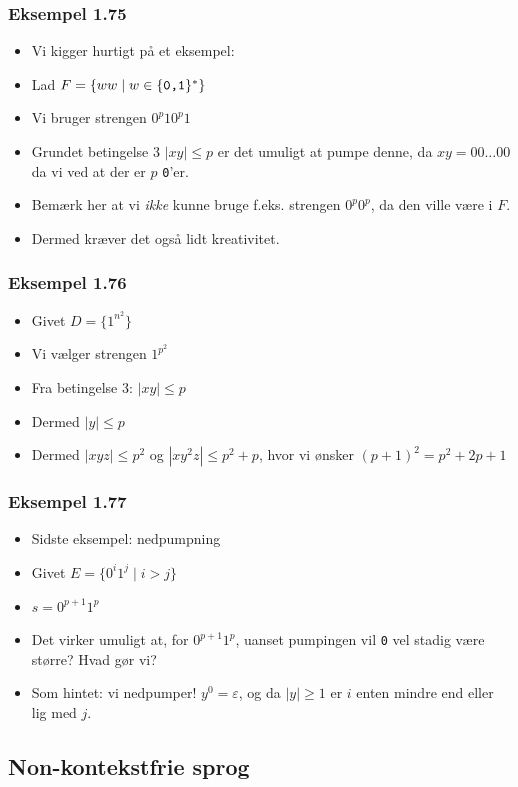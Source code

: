 \begin{frame}
	\frametitle{Eksempel 1.75}

	\begin{itemize}
		\item Vi kigger hurtigt på et eksempel:
		\item Lad $F = \{ww \mid w \in \{\text{\texttt{0,1}}\}^{*}\}$
		\item Vi bruger strengen $0^{p}10^{p}1$
		\item Grundet betingelse 3 $|xy| \le p$ er det umuligt at pumpe denne, da $xy = 00 \ldots 00$ da vi ved at der er $p$ \texttt{0}'er.
		\item Bemærk her at vi \textit{ikke} kunne bruge f.eks. strengen $0^{p}0^{p}$, da den ville være i $F$.
		\item Dermed kræver det også lidt kreativitet.
	\end{itemize}
\end{frame}

\begin{frame}
	\frametitle{Eksempel 1.76}
	\begin{itemize}
		\item Givet $D = \{1^{n^{2}}\}$
		\item Vi vælger strengen $1^{p^{2}}$
		\item Fra betingelse 3: $|xy| \le p$
		\item Dermed $|y| \le p$
		\item Dermed $|xyz| \le p^{2}$ og $|xy^{2}z| \le p^{2}+p$, hvor vi ønsker $(p+1)^{2} = p^{2} + 2p + 1$
	\end{itemize}
\end{frame}


\begin{frame}
	\frametitle{Eksempel 1.77}
	\begin{itemize}
		\item<1-> Sidste eksempel: nedpumpning
		\item<1-> Givet $E = \{0^{i}1^{j} \mid i > j\}$
		\item<1-> $s = 0^{p+1}1^{p}$
		\item<1-> Det virker umuligt at, for $0^{p+1}1^{p}$, uanset pumpingen vil \texttt{0} vel stadig være større? Hvad gør vi?
		\item<2> Som hintet: vi nedpumper! $y^{0} = \varepsilon$, og da $|y| \ge 1$ er $i$ enten mindre end eller lig med $j$.
	\end{itemize}
\end{frame}


\subsection{Non-kontekstfrie sprog}%
\label{subsec:nonkontekstfriesprog}

